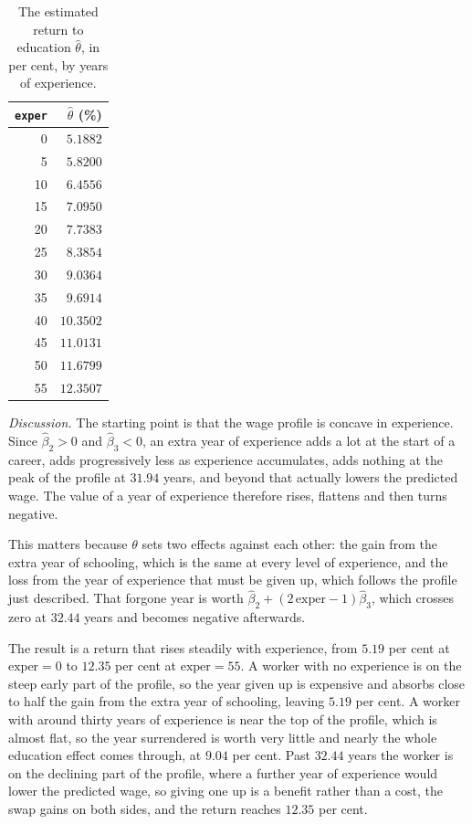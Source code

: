 \documentclass[11pt]{article}
\newcommand{\code}[1]{\texttt{#1}}
\begin{document}
\begin{table}[htbp]
\centering
\caption{The estimated return to education $\hat\theta$, in per cent, by years
of experience.}
\label{tab:q3-theta}
\small
\begin{tabular}{rr}
\toprule
\code{exper} & $\hat\theta$ (\%) \\
\midrule
 0 & $5.1882$ \\
 5 & $5.8200$ \\
10 & $6.4556$ \\
15 & $7.0950$ \\
20 & $7.7383$ \\
25 & $8.3854$ \\
30 & $9.0364$ \\
35 & $9.6914$ \\
40 & $10.3502$ \\
45 & $11.0131$ \\
50 & $11.6799$ \\
55 & $12.3507$ \\
\bottomrule
\end{tabular}
\end{table}

\emph{Discussion.} The starting point is that the wage profile is concave in
experience. Since $\hat\beta_2 > 0$ and $\hat\beta_3 < 0$, an extra year of
experience adds a lot at the start of a career, adds progressively less as
experience accumulates, adds nothing at the peak of the profile at $31.94$
years, and beyond that actually lowers the predicted wage. The value of a year
of experience therefore rises, flattens and then turns negative.

This matters because $\theta$ sets two effects against each other: the gain
from the extra year of schooling, which is the same at every level of
experience, and the loss from the year of experience that must be given up,
which follows the profile just described. That forgone year is worth
$\hat\beta_2 + (2\,\text{exper}-1)\hat\beta_3$, which crosses zero at
$32.44$ years and becomes negative afterwards.

The result is a return that rises steadily with experience, from $5.19$ per
cent at $\text{exper} = 0$ to $12.35$ per cent at $\text{exper} = 55$. A
worker with no experience is on the steep early part of the profile, so the
year given up is expensive and absorbs close to half the gain from the extra
year of schooling, leaving $5.19$ per cent. A worker with around thirty years
of experience is near the top of the profile, which is almost flat, so the
year surrendered is worth very little and nearly the whole education effect
comes through, at $9.04$ per cent. Past $32.44$ years the worker is on the
declining part of the profile, where a further year of experience would lower
the predicted wage, so giving one up is a benefit rather than a cost, the swap
gains on both sides, and the return reaches $12.35$ per cent.
\end{document}
